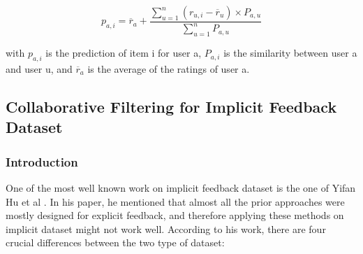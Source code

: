 \begin{displaymath}
p_{a,i} = \overline{r}_a + \frac{\sum_{u=1}^{n} (r_{u,i} - \overline{r}_{u}) \times P_{a,u}}{\sum_{u=1}^{n} P_{a,u}}  \tag{1} 
\end{displaymath}

with \(p_{a,i} \) is the prediction of item i for user a, \(P_{a,i}\) is the similarity between user a and user u, and \(\overline{r}_a\) is the average of the ratings of user a.  

\subsection{Collaborative Filtering for Implicit Feedback Dataset}

\subsubsection{Introduction}
One of the most well known work on implicit feedback dataset is the one of Yifan Hu et al \cite{hu2008collaborative}. In his paper, he mentioned that almost all the prior approaches were mostly designed for explicit feedback, and therefore applying these methods on implicit dataset might not work well. According to his work, there are four crucial differences between the two type of dataset:

